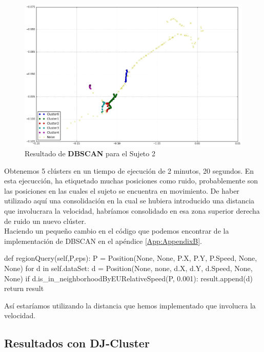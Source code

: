 \documentclass[a4paper, 12pt, spanish]{article}
\begin{document}
\begin{figure}[H]
	\includegraphics[width=15cm]{../comparativa/dbscanSujeto2.png}
	\caption{Resultado de \textbf{DBSCAN} para el Sujeto 2}
\end{figure}

Obtenemos 5 cl\'usters en un tiempo de ejecuci\'on de 2 minutos, 20 segundos. En esta ejecucci\'on, ha etiquetado muchas posiciones como ruido, probablemente son las posiciones en las cuales el sujeto se encuentra en movimiento. De haber utilizado aqu\'i una consolidaci\'on en la cual se hubiera introducido una distancia que involucrara la velocidad, habr\'iamos consolidado en esa zona superior derecha de ruido un nuevo cl\'uster. \\

Haciendo un peque\~no cambio en el c\'odigo que podemos encontrar de la implementaci\'on de DBSCAN en el ap\'endice \ref{App:AppendixB}.\\

\pagebreak

\begin{python}
def regionQuery(self,P,eps):
	P = Position(None, None, P.X, P.Y, P.Speed, None, None)
	for d in self.dataSet:
		d = Position(None, none, d.X, d.Y, d.Speed, None, None)
		if d.is_in_neighborhoodByEURelativeSpeed(P, 0.001):
			result.append(d)
	return result
\end{python}

As\'i estar\'iamos utilizando la distancia que hemos implementado que involucra la velocidad.

\subsection{Resultados con DJ-Cluster}
\end{document}
